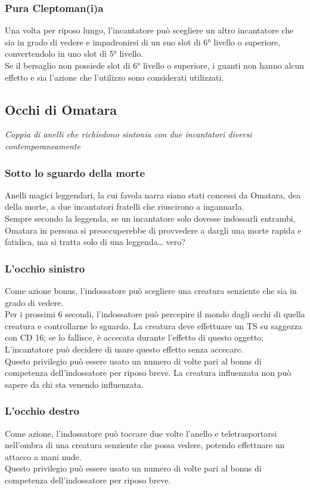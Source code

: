 \subsubsection{Pura Cleptoman(i)a}
Una volta per riposo lungo, l'incantatore può scegliere un altro incantatore che sia in grado di vedere e impadronirsi di un suo slot di 6° livello o superiore, convertendolo in uno slot di 5° livello. \\ Se il bersaglio non possiede slot di 6° livello o superiore, i guanti non hanno alcun effetto e sia l'azione che l'utilizzo sono considerati utilizzati.

\subsection{Occhi di Omatara}
\textit{Coppia di anelli che richiedono sintonia con due incantatori diversi contemporaneamente}

\subsubsection{Sotto lo sguardo della morte}
Anelli magici leggendari, la cui favola narra siano stati concessi da Omatara, dea della morte, a due incantatori fratelli che riuscirono a ingannarla. \\ Sempre secondo la leggenda, se un incantatore solo dovesse indossarli entrambi, Omatara in persona si preoccuperebbe di provvedere a dargli una morte rapida e fatidica, ma si tratta solo di una leggenda… vero? 

\subsubsection{L'occhio sinistro}
Come azione bonus, l'indossatore può scegliere una creatura senziente che sia in grado di vedere. \\ Per i prossimi 6 secondi, l'indossatore può percepire il mondo dagli occhi di quella creatura e controllarne lo sguardo. La creatura deve effettuare un TS su saggezza con CD 16; se lo fallisce, è accecata durante l'effetto di questo oggetto; L'incantatore può decidere di usare questo effetto senza accecare. \\ Questo privilegio può essere usato un numero di volte pari al bonus di competenza dell'indossatore per riposo breve. La creatura influenzata non può sapere da chi sta venendo influenzata.

\subsubsection{L'occhio destro}
Come azione, l'indossatore può toccare due volte l'anello e teletrasportarsi nell'ombra di una creatura senziente che possa vedere, potendo effettuare un attacco a mani nude. \\ Questo privilegio può essere usato un numero di volte pari al bonus di competenza dell'indossatore per riposo breve.

